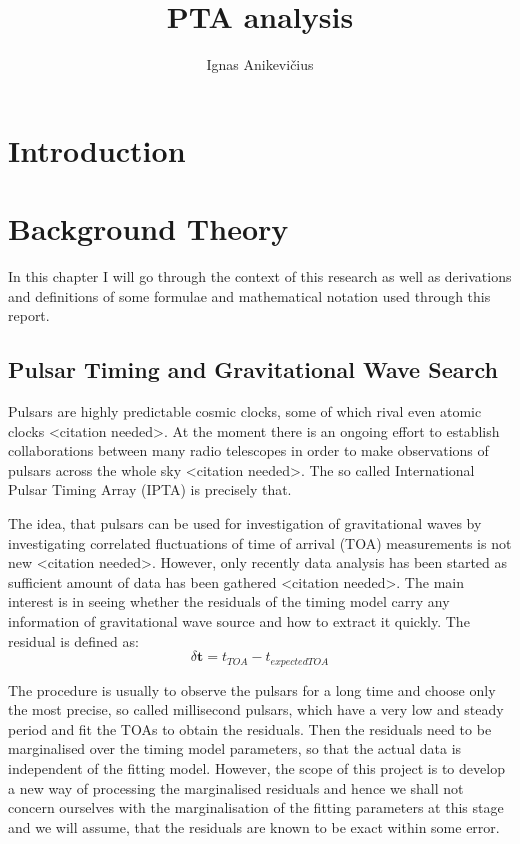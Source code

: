 \documentclass{scrreprt}
\author{Ignas Anikevičius}
\title{PTA analysis}
\renewcommand{\vec}[1]{\ensuremath{\mathbf{#1}}}
\begin{document}
    \maketitle
    \tableofcontents

    \chapter{Introduction}

    \chapter{Background Theory}

    In this chapter I will go through the context of this research as well as
    derivations and definitions of some formulae and mathematical notation used
    through this report.

    \section{Pulsar Timing and Gravitational Wave Search}

    Pulsars are highly predictable cosmic clocks, some of which rival even atomic
    clocks <citation needed>.
    At the moment there is an ongoing effort to establish collaborations between
    many radio telescopes in order to make observations of pulsars across the
    whole sky <citation needed>.
    The so called International Pulsar Timing Array (IPTA) is precisely that.

    The idea, that pulsars can be used for investigation of gravitational
    waves by investigating correlated fluctuations of time of arrival (TOA)
    measurements is not new <citation needed>.
    However, only recently data analysis has been started as sufficient amount of
    data has been gathered <citation needed>.
    The main interest is in seeing whether the residuals of the timing model
    carry any information of gravitational wave source and how to extract it
    quickly.
    The residual is defined as:
    \begin{equation}
        \delta \vec{t} = t_{TOA} - t_{expected TOA}
    \end{equation}

    The procedure is usually to observe the pulsars for a long time and choose
    only the most precise, so called millisecond pulsars, which have a very low
    and steady period and fit the TOAs to obtain the residuals.
    Then the residuals need to be marginalised over the timing model parameters,
    so that the actual data is independent of the fitting model.
    However, the scope of this project is to develop a new way of processing the
    marginalised residuals and hence we shall not concern ourselves with the
    marginalisation of the fitting parameters at this stage and we will assume,
    that the residuals are known to be exact within some error.
\end{document}
